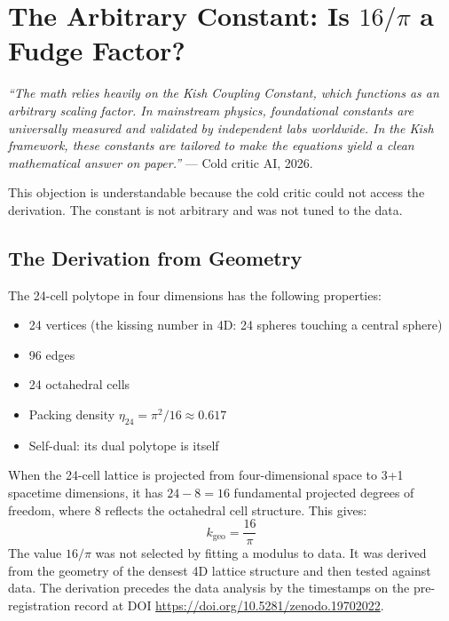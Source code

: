 \documentclass[11pt, letterpaper, openany]{book}
\begin{document}
\clearpage
\chapter{The Arbitrary Constant: Is $16/\pi$ a Fudge Factor?}

\begin{objectionbox}
\textit{``The math relies heavily on the Kish Coupling Constant,
which functions as an arbitrary scaling factor. In mainstream physics,
foundational constants are universally measured and validated by
independent labs worldwide. In the Kish framework, these constants
are tailored to make the equations yield a clean mathematical answer
on paper.''} --- Cold critic AI, 2026.
\end{objectionbox}

This objection is understandable because the cold critic could not
access the derivation. The constant is not arbitrary and was not
tuned to the data.

\section{The Derivation from Geometry}

The 24-cell polytope in four dimensions has the following properties:
\begin{itemize}
    \item 24 vertices (the kissing number in 4D: 24 spheres touching a central sphere)
    \item 96 edges
    \item 24 octahedral cells
    \item Packing density $\eta_{24} = \pi^2/16 \approx 0.617$
    \item Self-dual: its dual polytope is itself
\end{itemize}

When the 24-cell lattice is projected from four-dimensional space
to 3+1 spacetime dimensions, it has $24 - 8 = 16$ fundamental
projected degrees of freedom, where 8 reflects the octahedral cell
structure. This gives:
\[
k_\text{geo} = \frac{16}{\pi}
\]
The value $16/\pi$ was not selected by fitting a modulus to data.
It was derived from the geometry of the densest 4D lattice
structure and then tested against data. The derivation precedes
the data analysis by the timestamps on the pre-registration record
at DOI \url{https://doi.org/10.5281/zenodo.19702022}.
\end{document}
